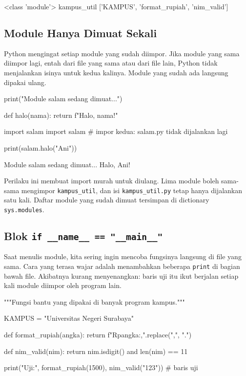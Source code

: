 \begin{keluaran}
<class 'module'>
kampus_util
['KAMPUS', 'format_rupiah', 'nim_valid']
\end{keluaran}

\subsection{Module Hanya Dimuat Sekali}

Python mengingat setiap module yang sudah diimpor. Jika module yang sama diimpor lagi, entah dari file yang sama atau dari file lain, Python tidak menjalankan isinya untuk kedua kalinya. Module yang sudah ada langsung dipakai ulang.

\begin{kode}[salam.py]
print("Module salam sedang dimuat...")

def halo(nama):
    return f"Halo, {nama}!"
\end{kode}

\begin{kode}[main.py]
import salam
import salam                  # impor kedua: salam.py tidak dijalankan lagi

print(salam.halo("Ani"))
\end{kode}

\begin{keluaran}
Module salam sedang dimuat...
Halo, Ani!
\end{keluaran}

Perilaku ini membuat import murah untuk diulang. Lima module boleh sama-sama mengimpor \texttt{kampus\_util}, dan isi \texttt{kampus\_util.py} tetap hanya dijalankan satu kali. Daftar module yang sudah dimuat tersimpan di dictionary \texttt{sys.modules}.

\subsection{Blok \texttt{if \_\_name\_\_ == "\_\_main\_\_"}}

Saat menulis module, kita sering ingin mencoba fungsinya langsung di file yang sama. Cara yang terasa wajar adalah menambahkan beberapa \texttt{print} di bagian bawah file. Akibatnya kurang menyenangkan: baris uji itu ikut berjalan setiap kali module diimpor oleh program lain.

\begin{kode}
"""Fungsi bantu yang dipakai di banyak program kampus."""

KAMPUS = "Universitas Negeri Surabaya"

def format_rupiah(angka):
    return f"Rp{angka:,}".replace(",", ".")

def nim_valid(nim):
    return nim.isdigit() and len(nim) == 11

print("Uji:", format_rupiah(1500), nim_valid("123"))      # baris uji
\end{kode}

